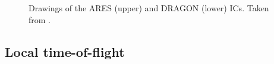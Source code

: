 \begin{figure}
\centering
{}
\caption{Drawings of the ARES (upper) and DRAGON (lower) ICs. Taken from \cite{coud03,vock08}.}
\label{fig:ICs}
\end{figure}


\subsection{Local time-of-flight}

